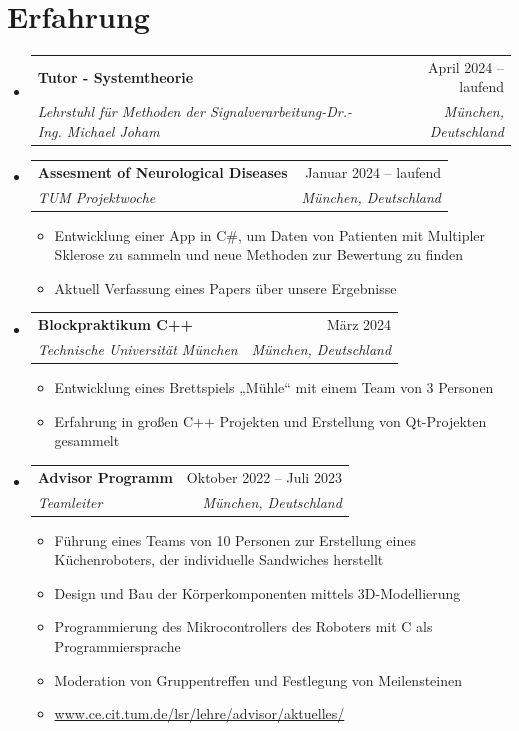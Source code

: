 \documentclass[a4paper,11pt]{article}
\makeatletter
\newcommand{\resumeItem}[1]{
  \item{
    {#1 \vspace{-4pt}}
  }
}
\newcommand{\resumeSubheading}[4]{
  \vspace{-2pt}\item
    \begin{tabular*}{0.97\textwidth}[t]{l@{\extracolsep{\fill}}r}
      \textbf{#1} & #2 \\
      \textit{\small #3} & \textit{\small #4} \\
    \end{tabular*}\vspace{-10pt}
}
\newcommand{\resumeSubHeadingListStart}{\begin{itemize}[leftmargin=0.15in, label={}]}
\newcommand{\resumeSubHeadingListEnd}{\end{itemize}}
\newcommand{\resumeItemListStart}{\begin{itemize}}
\newcommand{\resumeItemListEnd}{\end{itemize}\vspace{-2pt}}
\makeatother
\begin{document}
\section{Erfahrung}
\resumeSubHeadingListStart
\resumeSubheading
        {Tutor - Systemtheorie}{April 2024  -- laufend}
        {Lehrstuhl für Methoden der Signalverarbeitung-Dr.-Ing. Michael Joham\hspace{0.3cm}}{München, Deutschland}
          \vspace{0.cm}
\resumeSubheading
        {Assesment of Neurological Diseases}{Januar 2024  --  laufend}
        {TUM Projektwoche}{München, Deutschland}
        \resumeItemListStart
        \small\resumeItem{Entwicklung einer App in C#, um Daten von Patienten mit Multipler Sklerose zu sammeln und neue Methoden zur Bewertung zu finden}
        \resumeItem{Aktuell Verfassung eines Papers über unsere Ergebnisse}
        \resumeItemListEnd
        \vspace{0.1cm}
\resumeSubheading
        {Blockpraktikum C++}{März 2024}
        {Technische Universität München}{München, Deutschland}
        \resumeItemListStart
        \small\resumeItem{Entwicklung eines Brettspiels „Mühle“ mit einem Team von 3 Personen}
        \resumeItem{Erfahrung in großen C++ Projekten und Erstellung von Qt-Projekten gesammelt}
        \resumeItemListEnd
        \vspace{0.1cm}
\resumeSubheading
        {Advisor Programm}{Oktober 2022  -- Juli  2023}
        {Teamleiter}{München, Deutschland}
      \resumeItemListStart
        \small\resumeItem{Führung eines Teams von 10 Personen zur Erstellung eines Küchenroboters, der individuelle Sandwiches herstellt}
        \resumeItem{Design und Bau der Körperkomponenten mittels 3D-Modellierung}
        \resumeItem{Programmierung des Mikrocontrollers des Roboters mit C als Programmiersprache}
        \resumeItem{Moderation von Gruppentreffen und Festlegung von Meilensteinen}
         \resumeItem{{\url{www.ce.cit.tum.de/lsr/lehre/advisor/aktuelles/}}}
        \resumeItemListEnd
         
\resumeSubHeadingListEnd

\end{document}
